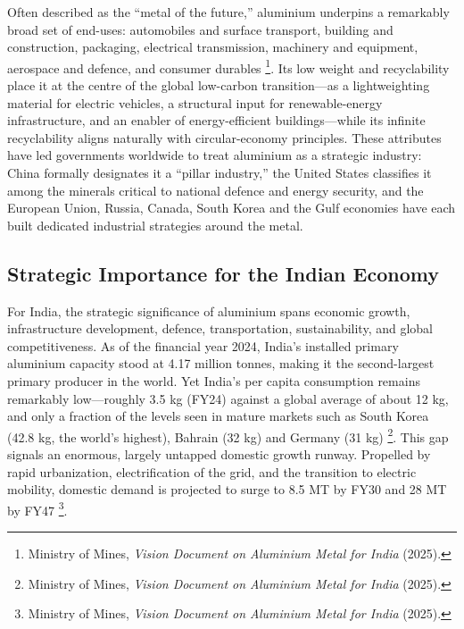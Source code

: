\documentclass[11pt, a4paper]{article}
\numberwithin{figure}{section}
\numberwithin{table}{section}
\begin{document}
Often described as the ``metal of the future,'' aluminium underpins a remarkably broad set of end-uses: automobiles and surface transport, building and construction, packaging, electrical transmission, machinery and equipment, aerospace and defence, and consumer durables \cite{mom_vision2025}\footnote{Ministry of Mines, \textit{Vision Document on Aluminium Metal for India} (2025).}. Its low weight and recyclability place it at the centre of the global low-carbon transition---as a lightweighting material for electric vehicles, a structural input for renewable-energy infrastructure, and an enabler of energy-efficient buildings---while its infinite recyclability aligns naturally with circular-economy principles. These attributes have led governments worldwide to treat aluminium as a strategic industry: China formally designates it a ``pillar industry,'' the United States classifies it among the minerals critical to national defence and energy security, and the European Union, Russia, Canada, South Korea and the Gulf economies have each built dedicated industrial strategies around the metal.

\subsection{Strategic Importance for the Indian Economy}
For India, the strategic significance of aluminium spans economic growth, infrastructure development, defence, transportation, sustainability, and global competitiveness. As of the financial year 2024, India's installed primary aluminium capacity stood at 4.17 million tonnes, making it the second-largest primary producer in the world. Yet India's per capita consumption remains remarkably low---roughly 3.5 kg (FY24) against a global average of about 12 kg, and only a fraction of the levels seen in mature markets such as South Korea (42.8 kg, the world's highest), Bahrain (32 kg) and Germany (31 kg) \cite{mom_vision2025}\footnote{Ministry of Mines, \textit{Vision Document on Aluminium Metal for India} (2025).}. This gap signals an enormous, largely untapped domestic growth runway. Propelled by rapid urbanization, electrification of the grid, and the transition to electric mobility, domestic demand is projected to surge to 8.5 MT by FY30 and 28 MT by FY47 \cite{mom_vision2025}\footnote{Ministry of Mines, \textit{Vision Document on Aluminium Metal for India} (2025).}.
\end{document}
